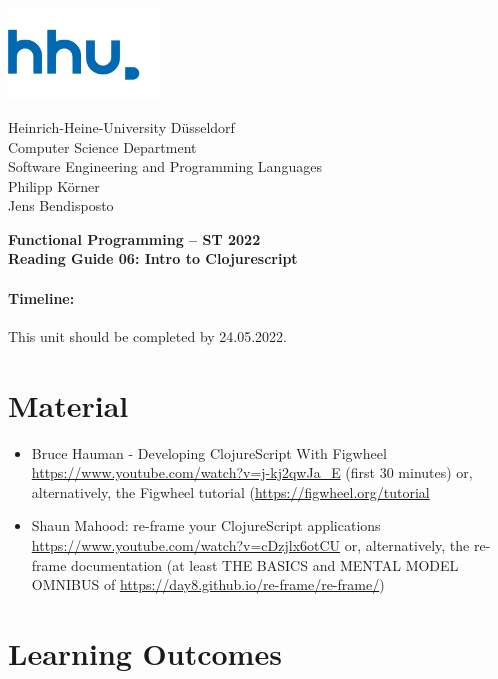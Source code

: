 \documentclass[11pt,a4paper]{article}
\begin{document}
\begin{minipage}[b]{\textwidth}
	\parbox[t]{5cm}{%
		\includegraphics[width=4cm]{unilogo}
		\hfill
	}
	\parbox[b]{11cm}{%
		Heinrich-Heine-University D\"usseldorf\\
		Computer Science Department\\
		Software Engineering and Programming Languages\\
		Philipp K\"orner \\
        Jens Bendisposto
	}
\end{minipage}
\begin{center}
	\bf
	Functional Programming -- ST 2022\\
    Reading Guide 06: Intro to Clojurescript
\end{center}

\pagestyle{empty}

\paragraph{Timeline:} This unit should be completed by 24.05.2022.

\section{Material} 

\renewcommand{\labelenumi}{\Alph{enumi}}
\begin{itemize}    
    \item Bruce Hauman - Developing ClojureScript With Figwheel \url{https://www.youtube.com/watch?v=j-kj2qwJa_E} (first 30 minutes)
        or, alternatively,  the Figwheel tutorial (\url{https://figwheel.org/tutorial}

    \item Shaun Mahood: re-frame your ClojureScript applications \url{https://www.youtube.com/watch?v=cDzjlx6otCU}
        or, alternatively,  the re-frame documentation (at least THE BASICS and MENTAL MODEL OMNIBUS of \url{https://day8.github.io/re-frame/re-frame/})
\end{itemize} 

\section{Learning Outcomes}
\end{document}
